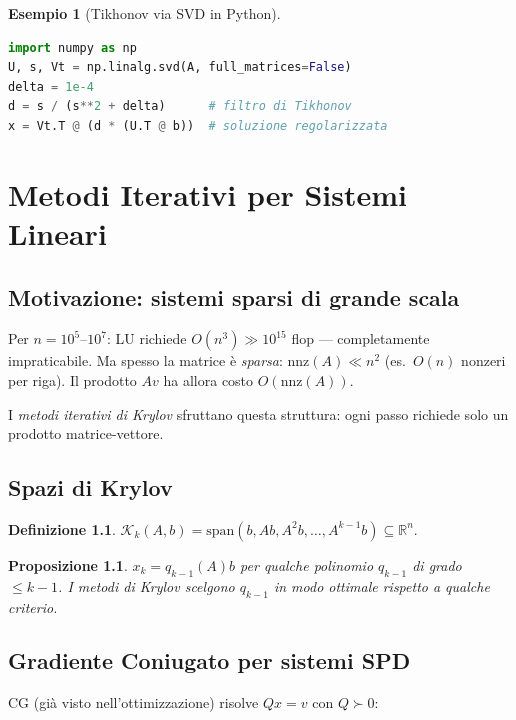 \documentclass[11pt, a4paper, twoside]{book}
\theoremstyle{definition}
\newtheorem{defn}{Definizione}[chapter]
\newtheorem{example}{Esempio}[chapter]
\theoremstyle{plain}
\newtheorem{prop}{Proposizione}[chapter]
\theoremstyle{remark}
\newcommand{\R}{\mathbb{R}}
\begin{document}
\begin{example}[Tikhonov via SVD in Python]
\begin{lstlisting}[language=Python]
import numpy as np
U, s, Vt = np.linalg.svd(A, full_matrices=False)
delta = 1e-4
d = s / (s**2 + delta)      # filtro di Tikhonov
x = Vt.T @ (d * (U.T @ b))  # soluzione regolarizzata
\end{lstlisting}
\end{example}

\chapter{Metodi Iterativi per Sistemi Lineari}

\section{Motivazione: sistemi sparsi di grande scala}

Per $n = 10^5$--$10^7$: LU richiede $O(n^3) \gg 10^{15}$ flop — completamente impraticabile. Ma spesso la matrice è \emph{sparsa}: $\mathrm{nnz}(A) \ll n^2$ (es.\ $O(n)$ nonzeri per riga). Il prodotto $Av$ ha allora costo $O(\mathrm{nnz}(A))$.

I \emph{metodi iterativi di Krylov} sfruttano questa struttura: ogni passo richiede solo un prodotto matrice-vettore.

\section{Spazi di Krylov}

\begin{defn}
$\mathcal{K}_k(A, b) = \mathrm{span}(b, Ab, A^2b, \ldots, A^{k-1}b) \subseteq \R^n$.
\end{defn}

\begin{prop}
$x_k = q_{k-1}(A)b$ per qualche polinomio $q_{k-1}$ di grado $\leq k-1$. I metodi di Krylov scelgono $q_{k-1}$ in modo ottimale rispetto a qualche criterio.
\end{prop}

\section{Gradiente Coniugato per sistemi SPD}
\label{sec:cg-sistemi}

CG (già visto nell'ottimizzazione) risolve $Qx = v$ con $Q \succ 0$:
\end{document}

